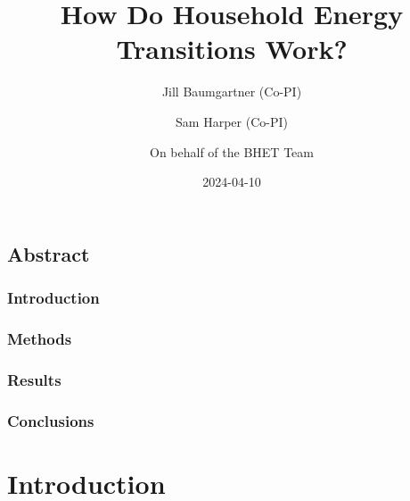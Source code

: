 \documentclass[
  letterpaper,
  DIV=11,
  numbers=noendperiod]{scrartcl}
\title{How Do Household Energy Transitions Work?}
\author{Jill Baumgartner (Co-PI) \and Sam Harper (Co-PI) \and On behalf
of the BHET Team}
\date{2024-04-10}
\renewcommand*\contentsname{Table of contents}
\newcommand\contentsname{Table of contents}
\begin{document}
\maketitle
\ifdefined\Shaded\renewenvironment{Shaded}{\begin{tcolorbox}[sharp corners, interior hidden, breakable, borderline west={3pt}{0pt}{shadecolor}, boxrule=0pt, enhanced, frame hidden]}{\end{tcolorbox}}\fi

\renewcommand*\contentsname{Table of contents}
{
\hypersetup{linkcolor=}
\setcounter{tocdepth}{3}
\tableofcontents
}
\hypertarget{abstract}{%
\subsection*{Abstract}\label{abstract}}

\hypertarget{introduction}{%
\subsubsection*{Introduction}\label{introduction}}

\hypertarget{methods}{%
\subsubsection*{Methods}\label{methods}}

\hypertarget{results}{%
\subsubsection*{Results}\label{results}}

\hypertarget{conclusions}{%
\subsubsection*{Conclusions}\label{conclusions}}

\hypertarget{introduction-1}{%
\section{Introduction}\label{introduction-1}}
\end{document}
